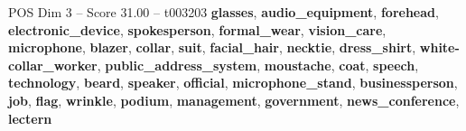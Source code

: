 \begin{textsample}{POS Dim 3 – Score 31.00 – t003203}  \label{ex:f3_pos_026}
\textbf{glasses}, \textbf{audio\_equipment}, \textbf{forehead}, \textbf{electronic\_device}, \textbf{spokesperson}, \textbf{formal\_wear}, \textbf{vision\_care}, \textbf{microphone}, \textbf{blazer}, \textbf{collar}, \textbf{suit}, \textbf{facial\_hair}, \textbf{necktie}, \textbf{dress\_shirt}, \textbf{white-collar\_worker}, \textbf{public\_address\_system}, \textbf{moustache}, \textbf{coat}, \textbf{speech}, \textbf{technology}, \textbf{beard}, \textbf{speaker}, \textbf{official}, \textbf{microphone\_stand}, \textbf{businessperson}, \textbf{job}, \textbf{flag}, \textbf{wrinkle}, \textbf{podium}, \textbf{management}, \textbf{government}, \textbf{news\_conference}, \textbf{lectern}

\end{textsample}
